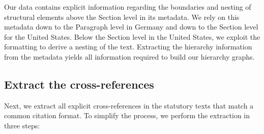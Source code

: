 Our data contains explicit information regarding the boundaries and nesting of structural elements above the Section level in its metadata. 
We rely on this metadata down to the Paragraph level in Germany 
and down to the Section level for the United States.
Below the Section level in the United States, we exploit the formatting to derive a nesting of the text. 
Extracting the hierarchy information from the metadata yields all information required to build our hierarchy graphs.

\subsection{Extract the cross-references}

Next, we extract all explicit cross-references in the statutory texts that match a common citation format. 
To simplify the process, we perform the extraction in three steps:


